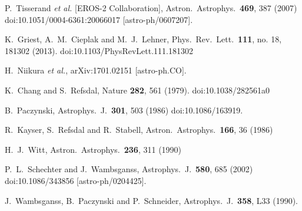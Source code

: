 \documentclass[showpacs,twocolumn,preprintnumbers,amsmath,amssymb,superscriptaddress,nofootinbib]{revtex4}
\begin{document}
\begin{thebibliography}{0}
  P.~Tisserand {\it et al.} [EROS-2 Collaboration],
  Astron.\ Astrophys.\  {\bf 469}, 387 (2007)
  doi:10.1051/0004-6361:20066017
  [astro-ph/0607207].

  K.~Griest, A.~M.~Cieplak and M.~J.~Lehner,
  Phys.\ Rev.\ Lett.\  {\bf 111}, no. 18, 181302 (2013).
  doi:10.1103/PhysRevLett.111.181302

  H.~Niikura {\it et al.},
  arXiv:1701.02151 [astro-ph.CO].

  K.~Chang and S.~Refsdal,
  Nature {\bf 282}, 561 (1979).
  doi:10.1038/282561a0

  B.~Paczynski,
  Astrophys.\ J.\  {\bf 301}, 503 (1986)
  doi:10.1086/163919.
  
  R.~Kayser, S.~Refsdal and R.~Stabell, 
  Astron.\ Astrophys.\  {\bf 166}, 36 (1986)
  
  H.~J.~Witt,
  Astron.\ Astrophys.\  {\bf 236}, 311 (1990)
  
  P.~L.~Schechter and J.~Wambsganss,
  Astrophys.\ J.\  {\bf 580}, 685 (2002)
  doi:10.1086/343856
  [astro-ph/0204425].
  
  J.~Wambsganss, B.~Paczynski and P.~Schneider,
  Astrophys.\ J.\  {\bf 358}, L33 (1990).


\end{thebibliography}
\end{document}
